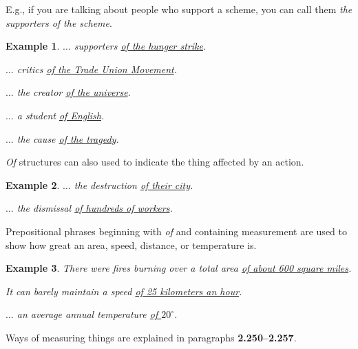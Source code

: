 \documentclass[oneside]{book}
\numberwithin{equation}{section}
\newtheorem{example}{Example}[section]
\begin{document}
E.g., if you are talking about people who support a scheme, you can call them \textit{the supporters of the scheme}.
\begin{example}
    $\ldots$ supporters \underline{of the hunger strike}.
    
    $\ldots$ critics \underline{of the Trade Union Movement}.
    
    $\ldots$ the creator \underline{of the universe}.
    
    $\ldots$ a student \underline{of English}.
    
    $\ldots$ the cause \underline{of the tragedy}.
\end{example}
\textit{Of} structures can also used to indicate the thing affected by an action.
\begin{example}
    $\ldots$ the destruction \underline{of their city}.
    
    $\ldots$ the dismissal \underline{of hundreds of workers}.
\end{example}
%
\noindent{} Prepositional phrases beginning with \textit{of} and containing measurement are used to show how great an area, speed, distance, or temperature is.
\begin{example}
    There were fires burning over a total area \underline{of about 600 square miles}.
    
    It can barely maintain a speed \underline{of 25 kilometers an hour}.
    
    $\ldots$ an average annual temperature \underline{of $20^\circ$}.
\end{example}
Ways of measuring things are explained in paragraphs \textbf{2.250--2.257}.
\end{document}
